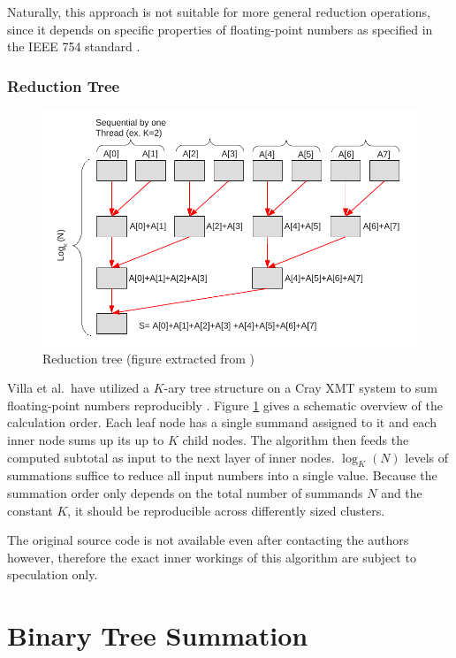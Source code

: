 Naturally, this approach is not suitable for more general reduction operations, since it depends on specific properties
of floating-point numbers as specified in the IEEE 754 standard \cite{noauthor_ieee_nodate-1}.


\subsection{Reduction Tree}
\label{sec:ReductionTree}

\begin{figure}[H]
\centering
\includegraphics[scale=0.7]{figures/villa_et_al_reduction_tree.pdf}
\caption{Reduction tree (figure extracted from \cite{villa_effects_2009})}
\label{fig:villa_reduction_tree}
\end{figure}


Villa et al.\ have utilized a $K$-ary tree structure on a Cray XMT system to sum floating-point numbers reproducibly \cite{villa_effects_2009}.
Figure \ref{fig:villa_reduction_tree} gives a schematic overview of the calculation order. Each leaf node has a single summand assigned to it
and each inner node sums up its up to $K$ child nodes. The algorithm then feeds the computed subtotal as input to the next layer of inner nodes.
$\log_K (N)$ levels of summations suffice to reduce all input numbers into a single value. Because the summation order only depends on the total number
of summands $N$ and the constant $K$, it should be reproducible across differently sized clusters.

The original source code is not available even after contacting the authors however, therefore the exact inner workings of this algorithm are
subject to speculation only.

\chapter{Binary Tree Summation}
\label{ch:BinaryTreeSummation}

